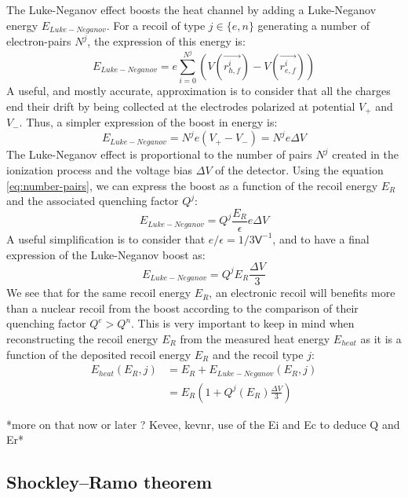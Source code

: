 The Luke-Neganov effect boosts the heat channel by adding a Luke-Neganov energy $E_{Luke-Neganov}$. For a recoil of type $j \in \{ e, n\}$ generating a number of electron-pairs $N^j$, the expression of this energy is:
\begin{equation}
E_{Luke-Neganov} = e \sum_{i=0}^{N^j} \left( V(\vec{r_{h,f}^i}) - V(\vec{r_{e,f}^i}) \right)
\end{equation}
A useful, and mostly accurate, approximation is to consider that all the charges end their drift by being collected at the electrodes polarized at potential $V_+$ and $V_-$. Thus, a simpler expression of the boost in energy is:
\begin{equation}
E_{Luke-Neganov} = N^j e (V_+ - V_-) = N^j e \Delta V
\end{equation}
The Luke-Neganov effect is proportional to the number of pairs $N^j$ created in the ionization process and the voltage bias $\Delta V$ of the detector. Using the equation \ref{eq:number-pairs}, we can express the boost as a function of the recoil energy $E_R$ and the associated quenching factor $Q^j$:
\begin{equation}
E_{Luke-Neganov} = Q^j \frac{E_R}{\epsilon} e \Delta V
\end{equation}
A useful simplification is to consider that $e / {\epsilon} = 1/3 \textsf{V}^{-1}$,  and to have a final expression of the Luke-Neganov boost as:
\begin{equation}
\label{eq:nl-boost}
E_{Luke-Neganov} = Q^j E_R \frac{\Delta V}{3}
\end{equation}
We see that for the same recoil energy $E_R$, an electronic recoil will benefits more than a nuclear recoil from the boost according to the comparison of  their quenching factor $Q^e > Q^n$. This is very important to keep in mind when reconstructing the recoil energy $E_R$ from the measured heat energy $E_{heat}$ as it is a function of the deposited recoil energy $E_R$ and the recoil type $j$:
\begin{align}
E_{heat} (E_R, j ) &= E_{R} + E_{Luke-Neganov} ( E_R, j) \\
&= E_R \left( 1 + Q^j(E_R) \frac{\Delta V}{3} \right)
\end{align}

*more on that now or later ? Kevee, kevnr, use of the Ei and Ec to deduce Q and Er*


\subsection{Shockley–Ramo theorem}

